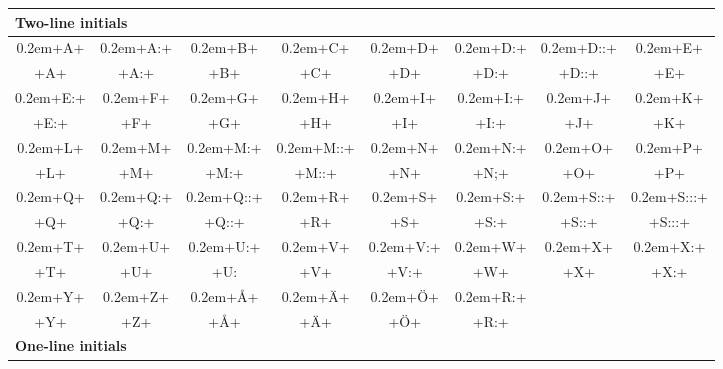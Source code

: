 \documentclass[a4paper, 12pt]{article}
\newcommand{\initsample}[1]{{\initsamplefont #1}}
\newcommand{\initsamplefont}{\fontsize{36}{36}\fontspec{Missaali}\spaceskip0.2em}
\begin{document}
\begin{figure}
  \centering
  {\renewcommand{\arraystretch}{1.3}
  \begin{tabular}{cccccccc}
    \multicolumn{6}{l}{\textbf{Two-line initials}} \\
    \hline
\initsample{+A+} & 
\initsample{+A:+} & 
\initsample{+B+} & 
\initsample{+C+} & 
\initsample{+D+} & 
\initsample{+D:+} & 
\initsample{+D::+} &
\initsample{+E+} \\

+A+ & +A:+ & +B+ & +C+ & +D+ & +D:+ & +D::+ & +E+ \\

\initsample{+E:+} & 
\initsample{+F+} & 
\initsample{+G+} & 
\initsample{+H+} & 
\initsample{+I+} & 
\initsample{+I:+} &
\initsample{+J+} &
\initsample{+K+} \\ 


+E:+ & +F+ & +G+ & +H+ & +I+ & +I:+ & +J+ & +K+ \\

\initsample{+L+} & 
\initsample{+M+} & 
\initsample{+M:+} & 
\initsample{+M::+} & 
\initsample{+N+} &
\initsample{+N:+} & 
\initsample{+O+} & 
\initsample{+P+} \\

+L+ & +M+ & +M:+ & +M::+ & +N+ & +N;+ & +O+ & +P+\\

\initsample{+Q+} & 
\initsample{+Q:+} & 
\initsample{+Q::+} & 
\initsample{+R+} &
\initsample{+S+} &
\initsample{+S:+} & 
\initsample{+S::+} & 
\initsample{+S:::+} \\


+Q+ & +Q:+ & +Q::+ & +R+  & +S+ & +S:+ & +S::+ & +S:::+ \\

\initsample{+T+} & 
\initsample{+U+} & 
\initsample{+U:+} &
\initsample{+V+} &
\initsample{+V:+} & 
\initsample{+W+} & 
\initsample{+X+}  &
\initsample{+X:+} \\

+T+ & +U+ & +U: & +V+ & +V:+ & +W+ & +X+ & +X:+  \\

\initsample{+Y+} & 
\initsample{+Z+} &
\initsample{+Å+} &
\initsample{+Ä+} & 
\initsample{+Ö+} & 
\initsample{+R:+} \\

+Y+ & +Z+ & +Å+ & +Ä+ & +Ö+ & +R:+  \\

\multicolumn{6}{l}{\textbf{One-line initials}} \\



\end{tabular}}
\end{figure}
\end{document}
